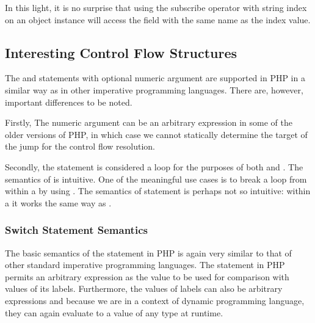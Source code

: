     In this light, it is no 
    surprise that using the subscribe operator 
    \code{[]} with string index on an object instance will 
    access the field with the same name as the index value.

    \subsection{Interesting Control Flow Structures}
    The  and  statements with 
    optional numeric argument are supported in PHP in a 
    similar way as in other imperative programming 
    languages. There are, however, important differences 
    to be noted.
    
    Firstly, The numeric argument can be an arbitrary 
    expression in some of the older versions of PHP, in which 
    case we cannot statically determine the target of 
    the jump for the control flow resolution.
    
    Secondly, the  statement is considered 
    a loop for the purposes of both  and 
    . The semantics of  
    is intuitive. One of the meaningful use cases is to 
    break a loop from within a  by 
    using . The semantics of 
     statement 
    is perhaps not so intuitive: within a  
    it works the same way as .
    
    \subsubsection*{Switch Statement Semantics} 
    The basic semantics of the  statement in PHP is 
    again very similar to that of other standard imperative 
    programming languages. The  statement in PHP 
    permits an arbitrary expression as the value to be used 
    for comparison with values of its  labels. Furthermore, 
    the values of  labels can also be arbitrary 
    expressions and because we are in a context of dynamic 
    programming language, they can again evaluate to a value 
    of any type at runtime.
    

